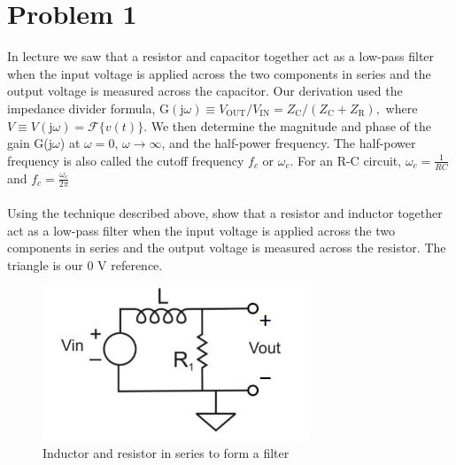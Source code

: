 \documentclass[12pt, a4paper]{article}
\begin{document}
\vspace*{-3mm}
\section*{Problem 1} 
In lecture we saw that a resistor and capacitor together act as a low-pass filter when the
input voltage is applied across the two components in series and the output voltage is
measured across the capacitor. Our derivation used the impedance divider formula,
$\mathrm{G}(\mathrm{j} \omega) \equiv V_{\mathrm{OUT}} / V_{\mathrm{IN}}=Z_{\mathrm{C}} /\left(Z_{\mathrm{C}}+Z_{\mathrm{R}}\right),$ where $V \equiv V(\mathrm{j} \omega)=\mathcal{F}\{v(t)\}$. We then determine the
magnitude and phase of the gain G(j$\omega$) at $\omega =0$, $\omega \to \infty$, and the half-power frequency.
The half-power frequency is also called the cutoff frequency $f_c$ or $\omega_c$. For an R-C circuit, $\omega_c = \frac{1}{RC}$ and $f_c= \frac{\omega_c}{2\pi}$ \\ \\
Using the technique described above, show that a resistor and inductor together act as a
low-pass filter when the input voltage is applied across the two components in series and
the output voltage is measured across the resistor. The triangle is our 0 V reference.
\begin{figure}[H]
\begin{center}
\hypertarget{plot1}{}
\includegraphics[width = 8cm]{fig1}
\caption{\label{fig:scaled_diss} Inductor and resistor in series to form a filter}
\end{center}
\end{figure}
\end{document}
